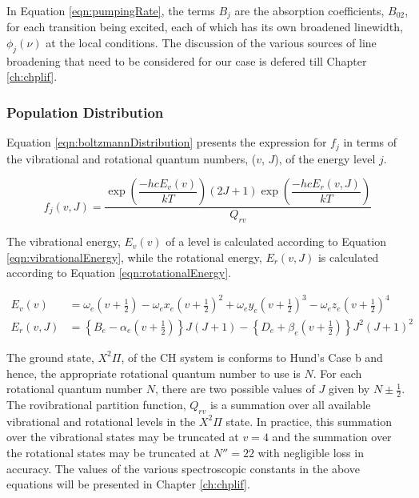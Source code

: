 In Equation \ref{eqn:pumpingRate}, the terms \(B_j\) are the absorption coefficients, \(B_{02}\), for each transition being excited, each of which has its own broadened linewidth, \(\phi_j(\nu)\) at the local conditions.
The discussion of the various sources of line broadening that need to be considered for our case is defered till Chapter \ref{ch:chplif}.

\subsubsection{Population Distribution}
\label{subsubsec:improved-model-population-distribution}

Equation \ref{eqn:boltzmannDistribution} presents the expression for \(f_j\) in terms of the vibrational and rotational quantum numbers, (\(v\), \(J\)), of the energy level \(j\).

\begin{equation}
  f_j(v,J) = \frac{ \exp{\left(\dfrac{-hcE_v(v)}{kT}\right)} (2J + 1)\exp{\left(\dfrac{-hcE_r(v, J)}{kT}\right)} }{ Q_{rv} }
  \label{eqn:boltzmannDistribution}
\end{equation}


The vibrational energy, \(E_v(v)\) of a level is calculated according to Equation \ref{eqn:vibrationalEnergy}, while the rotational energy, \(E_r(v,J)\) is calculated according to Equation \ref{eqn:rotationalEnergy}.

\begin{align}
  E_v(v) &= \omega_e \left(v+\frac{1}{2}\right) - \omega_ex_e \left(v+\frac{1}{2}\right)^2 + \omega_ey_e \left(v+\frac{1}{2}\right)^3 - \omega_ez_e \left(v+\frac{1}{2}\right)^4
  \label{eqn:vibrationalEnergy}\\
  E_r(v, J) &= \left\{B_e - \alpha_e \left(v+\frac{1}{2}\right)\right\}J(J+1) - \left\{D_e + \beta_e \left(v+\frac{1}{2}\right)\right\}J^2(J+1)^2
  \label{eqn:rotationalEnergy}
\end{align}


The ground state, \(X^2\Pi\), of the CH system is conforms to Hund's Case b\cite{1987-bernath} and hence, the appropriate rotational quantum number to use is \(N\).
For each rotational quantum number \(N\), there are two possible values of \(J\) given by \(N \pm \frac{1}{2}\).
The rovibrational partition function, \(Q_{rv}\) is a summation over all available vibrational and rotational levels in the \(X^2\Pi\) state.
In practice, this summation over the vibrational states may be truncated at \(v=4\) and the summation over the rotational states may be truncated at \(N''=22\) with negligible loss in accuracy.
The values of the various spectroscopic constants in the above equations will be presented in Chapter \ref{ch:chplif}.

